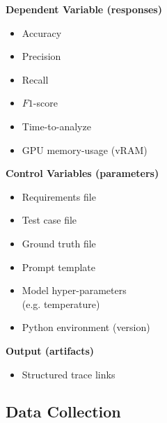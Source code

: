 \documentclass[conference]{IEEEtran}
\begin{document}
\begin{center}
\begin{tcbraster}[raster columns=2, raster column skip=5pt, raster equal height=rows, raster row skip=5pt]
\begin{roundedBox}
            \textbf{Dependent Variable (responses)}
            \begin{itemize}
                \item Accuracy
                \item Precision
                \item Recall
                \item $F1$-score
                \item Time-to-analyze
                \item GPU memory-usage (vRAM)
            \end{itemize}
        \end{roundedBox}
        \begin{roundedBox}
            \centering 
            \textbf{Control Variables (parameters)}
            \begin{itemize}
                \item Requirements file
                \item Test case file
                \item Ground truth file
                \item Prompt template
                \item Model hyper-parameters \\ (e.g. temperature)
                \item Python environment (version)
            \end{itemize}
        \end{roundedBox}
        \end{tcbraster}
        \begin{roundedBox}
            \centering
            \textbf{Output (artifacts)}
            \begin{itemize}
            \centering
                \item Structured trace links
            \end{itemize}
        \end{roundedBox}
\end{center}

\subsection{Data Collection}
\end{document}
